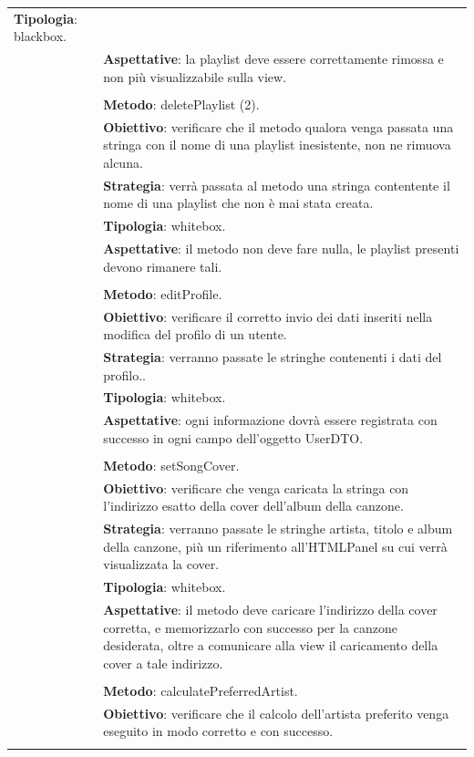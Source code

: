 \begin{footnotesize}
\begin{longtable}{|p{5.7cm}|p{10.3cm}|}
\textbf{Tipologia}: blackbox.\\&
\textbf{Aspettative}: la playlist deve essere correttamente rimossa e non
pi\`u visualizzabile sulla view.\\&
\\&
\textbf{Metodo}: deletePlaylist (2).\\&
\textbf{Obiettivo}: verificare che il metodo qualora venga passata
una stringa con il nome di una playlist inesistente, non ne rimuova alcuna.\\&
\textbf{Strategia}: verr\`a passata al metodo una stringa contentente il nome di
una playlist che non \`e mai stata creata.\\& 
\textbf{Tipologia}: whitebox.\\&
\textbf{Aspettative}: il metodo non deve fare nulla, le playlist presenti
devono rimanere tali.\\&
\\&
\textbf{Metodo}: editProfile.\\&
\textbf{Obiettivo}: verificare il corretto invio dei dati inseriti
nella modifica del profilo di un utente.\\&
\textbf{Strategia}: verranno passate le stringhe contenenti i dati del profilo..\\&
\textbf{Tipologia}: whitebox.\\&
\textbf{Aspettative}: ogni informazione dovr\`a essere registrata con successo
in ogni campo dell'oggetto UserDTO.\\&
\\&
\textbf{Metodo}: setSongCover.\\&
\textbf{Obiettivo}: verificare che venga caricata la stringa con
l'indirizzo esatto della cover dell'album della canzone.\\&
\textbf{Strategia}: verranno passate le stringhe artista, titolo e album della
canzone, pi\`u un riferimento all'HTMLPanel su cui verr\`a visualizzata la
cover.\\&
\textbf{Tipologia}: whitebox.\\&
\textbf{Aspettative}: il metodo deve caricare l'indirizzo della cover
corretta, e memorizzarlo con successo per la canzone desiderata, oltre a
comunicare alla view il caricamento della cover a tale indirizzo.\\&
\\&
\textbf{Metodo}: calculatePreferredArtist.\\&
\textbf{Obiettivo}: verificare che il calcolo dell'artista preferito
venga eseguito in modo corretto e con successo.\\&

\end{longtable}
\end{footnotesize}
